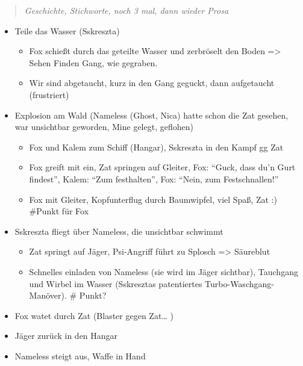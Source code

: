 \documentclass[11pt]{article}
\begin{document}
\begin{quote}
\emph{Geschichte, Stichworte, noch 3 mal, dann wieder Prosa}

\end{quote}
\begin{itemize}
\item
  Teile das Wasser (Sskreszta)

  \begin{itemize}
  \item
    Fox schießt durch das geteilte Wasser und zerbröselt den Boden
    =\textgreater{} Sehen Finden Gang, wie gegraben.
  \item
    Wir sind abgetaucht, kurz in den Gang geguckt, dann aufgetaucht
    (frustriert)
  \end{itemize}
\item
  Explosion am Wald (Nameless (Ghost, Nica) hatte schon die Zat gesehen,
  war unsichtbar geworden, Mine gelegt, geflohen)

  \begin{itemize}
  \item
    Fox und Kalem zum Schiff (Hangar), Sskreszta in den Kampf gg Zat
  \item
    Fox greift mit ein, Zat springen auf Gleiter, Fox: ``Guck, dass du'n
    Gurt findest'', Kalem: ``Zum festhalten'', Fox: ``Nein, zum
    Festschnallen!''
  \item
    Fox mit Gleiter, Kopfunterflug durch Baumwipfel, viel Spaß, Zat :)
    \#Punkt für Fox
  \end{itemize}
\item
  Sskreszta fliegt über Nameless, die unsichtbar schwimmt

  \begin{itemize}
  \item
    Zat springt auf Jäger, Psi-Angriff führt zu Splosch =\textgreater{}
    Säureblut
  \item
    Schnelles einladen von Nameless (sie wird im Jäger sichtbar),
    Tauchgang und Wirbel im Wasser (Sskresztas patentiertes
    Turbo-Waschgang-Manöver). \# Punkt?
  \end{itemize}
\item
  Fox watet durch Zat (Blaster gegen Zat\ldots{} )
\item
  Jäger zurück in den Hangar
\item
  Nameless steigt aus, Waffe in Hand


\end{itemize}
\end{document}
